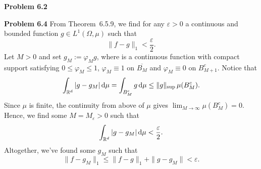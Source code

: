 
\textbf{Problem 6.2}


\bigskip
\textbf{Problem 6.4}
From Theorem~6.5.9, we find for any $\varepsilon>0$ a continuous and bounded function $g\in L^1(\Omega,\mu)$ such that
\[
	\|f-g\|_1 <\frac{\varepsilon}{2}.
\]
Let $M>0$ and set $g_M:= \varphi_M g$, where is a continuous function with compact support satisfying $0\le \varphi_M \le 1$, $\varphi_M\equiv 1$ on $\overline{B_M}$ and $\varphi_M\equiv 0$ on $B_{M+1}^c$. Notice that
	\begin{align*}
		\int_{\mathbb R^d} |g-g_M|\,\mathrm{d}\mu = \int_{B_M^c} g\,\mathrm{d}\mu \le \|g\|_{\sup}\,\mu(B_M^c).
	\end{align*}
Since $\mu$ is finite, the continuity from above of $\mu$ gives $\lim_{M\to\infty} \mu(B_{M}^c) = 0$. Hence, we find some $M=M_\varepsilon>0$ such that
\[
	\int_{\mathbb R^d} |g-g_M|\,\mathrm{d}\mu < \frac{\varepsilon}{2}.
\]
Altogether, we've found some $g_M$ such that
\[
	\|f-g_M\|_1 \le \|f-g\|_1 + \|g-g_M\| < \varepsilon.
\]